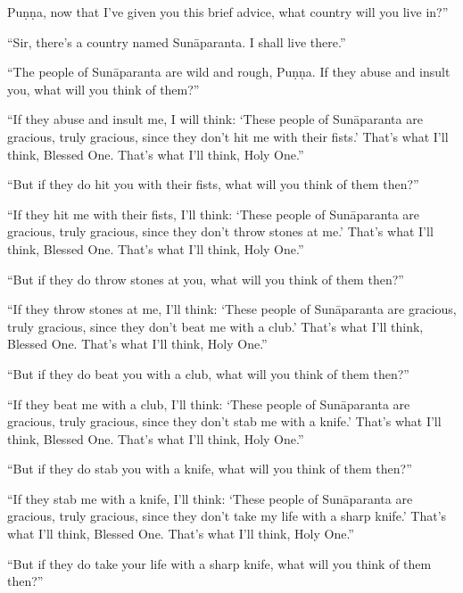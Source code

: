 \documentclass[12pt,openany]{book}%
\begin{document}
\textsanskrit{Puṇṇa}, now that I’ve given you this brief advice, what country will you live in?” 

“Sir, there’s a country named \textsanskrit{Sunāparanta}. I shall live there.” 

“The people of \textsanskrit{Sunāparanta} are wild and rough, \textsanskrit{Puṇṇa}. If they abuse and insult you, what will you think of them?” 

“If they abuse and insult me, I will think: ‘These people of \textsanskrit{Sunāparanta} are gracious, truly gracious, since they don’t hit me with their fists.’ That’s what I’ll think, Blessed One. That’s what I’ll think, Holy One.” 

“But if they do hit you with their fists, what will you think of them then?” 

“If they hit me with their fists, I’ll think: ‘These people of \textsanskrit{Sunāparanta} are gracious, truly gracious, since they don’t throw stones at me.’ That’s what I’ll think, Blessed One. That’s what I’ll think, Holy One.” 

“But if they do throw stones at you, what will you think of them then?” 

“If they throw stones at me, I’ll think: ‘These people of \textsanskrit{Sunāparanta} are gracious, truly gracious, since they don’t beat me with a club.’ That’s what I’ll think, Blessed One. That’s what I’ll think, Holy One.” 

“But if they do beat you with a club, what will you think of them then?” 

“If they beat me with a club, I’ll think: ‘These people of \textsanskrit{Sunāparanta} are gracious, truly gracious, since they don’t stab me with a knife.’ That’s what I’ll think, Blessed One. That’s what I’ll think, Holy One.” 

“But if they do stab you with a knife, what will you think of them then?” 

“If they stab me with a knife, I’ll think: ‘These people of \textsanskrit{Sunāparanta} are gracious, truly gracious, since they don’t take my life with a sharp knife.’ That’s what I’ll think, Blessed One. That’s what I’ll think, Holy One.” 

“But if they do take your life with a sharp knife, what will you think of them then?” 
\end{document}
